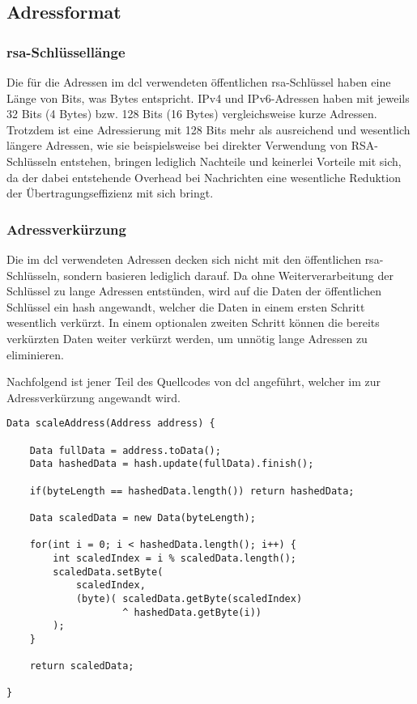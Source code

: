 \subsection{Adressformat}

\subsubsection{\gls*{rsa}-Schlüssellänge}
Die für die Adressen im \gls{dcl} verwendeten öffentlichen \gls{rsa}-Schlüssel haben eine Länge von \addrkeybits
Bits, was \addrkeybytes Bytes entspricht.
IPv4 und IPv6-Adressen haben mit jeweils 32 Bits (4 Bytes) bzw. 128 Bits (16 Bytes) vergleichsweise kurze
Adressen. Trotzdem ist eine Adressierung mit 128 Bits mehr als ausreichend und wesentlich längere
Adressen, wie sie beispielsweise bei direkter Verwendung von RSA-Schlüsseln entstehen, bringen
lediglich Nachteile und keinerlei Vorteile mit sich, da der dabei entstehende Overhead bei Nachrichten
eine wesentliche Reduktion der Übertragungseffizienz mit sich bringt.

\subsubsection{Adressverkürzung}
Die im \gls{dcl} verwendeten Adressen decken sich nicht mit den öffentlichen \gls{rsa}-Schlüsseln,
sondern basieren lediglich darauf. Da ohne Weiterverarbeitung der Schlüssel zu lange Adressen entstünden,
wird auf die Daten der öffentlichen Schlüssel ein \gls{hash} angewandt, welcher die Daten in einem ersten
Schritt wesentlich verkürzt. In einem optionalen zweiten Schritt können die bereits verkürzten
Daten weiter verkürzt werden, um unnötig lange Adressen zu eliminieren.

Nachfolgend ist jener Teil des Quellcodes von \gls{dcl} angeführt, welcher im 
zur Adressverkürzung angewandt wird.

\javalisting
\begin{minipage}{\linewidth}
\begin{lstlisting}[caption={Adressverkürzung im \gls*{cnt} (Java)},captionpos=b]
Data scaleAddress(Address address) {
	
	Data fullData = address.toData();
	Data hashedData = hash.update(fullData).finish();
	
	if(byteLength == hashedData.length()) return hashedData;
	
	Data scaledData = new Data(byteLength);
	
	for(int i = 0; i < hashedData.length(); i++) {
		int scaledIndex = i % scaledData.length();
		scaledData.setByte(
			scaledIndex,
			(byte)( scaledData.getByte(scaledIndex)
					^ hashedData.getByte(i))
		);
	}
	
	return scaledData;
	
}
\end{lstlisting}
\end{minipage}

